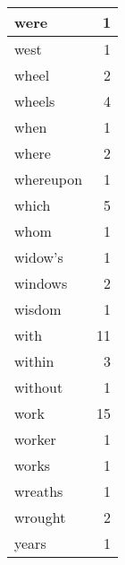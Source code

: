 \begin{center}
\begin{longtable}{l|r}
were & 1 \\ \hline
west & 1 \\ \hline
wheel & 2 \\ \hline
wheels & 4 \\ \hline
when & 1 \\ \hline
where & 2 \\ \hline
whereupon & 1 \\ \hline
which & 5 \\ \hline
whom & 1 \\ \hline
widow's & 1 \\ \hline
windows & 2 \\ \hline
wisdom & 1 \\ \hline
with & 11 \\ \hline
within & 3 \\ \hline
without & 1 \\ \hline
work & 15 \\ \hline
worker & 1 \\ \hline
works & 1 \\ \hline
wreaths & 1 \\ \hline
wrought & 2 \\ \hline
years & 1 \\ \hline
\end{longtable}
\end{center}



\normalsize



